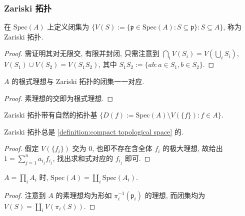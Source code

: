 \subsubsection{Zariski 拓扑}

\begin{definition}
    \label {definition:Zariski topology}
    在 \(\mathrm{Spec} (A)\) 上定义闭集为 \(\{V(S) := \{\mathfrak{p} \in \mathrm{Spec} (A) : S \subseteq \mathfrak{p}\} : S \subseteq A\}\),
    称为 Zariski 拓扑.

    \begin{proof}
        需证明其对无限交, 有限并封闭, 只需注意到 \(\bigcap_i V(S_i) = V(\bigcup_i S_i)\), \(V(S_1) \cup V(S_2) = V(S_1 S_2)\),
        其中 \(S_1 S_2 := \{ab : a \in S_1, b \in S_2\}\).
    \end{proof}
\end{definition}

\begin{lemma}
    \(A\) 的根式理想与 Zariski 拓扑的闭集一一对应.

    \begin{proof}
        素理想的交即为根式理想.
    \end{proof}
\end{lemma}

\begin{corollary}
    Zariski 拓扑带有自然的拓扑基 \(\{D(f) := \mathrm{Spec} (A) \setminus V(\{f\}) : f \in A\}\).
\end{corollary}

\begin{lemma}
    Zariski 拓扑总是 \ref{definition:compact topological space} 的.

    \begin{proof}
        假定 \(V(\{f_i\})\) 交为 \(0\), 也即不存在含全体 \(f_i\) 的极大理想, 故给出 \(1 = \sum_{j=1}^{n} a_{i_j} f_{i_j}\),
        找出求和式对应的 \(f_{i_j}\) 即可.
    \end{proof}
\end{lemma}

\begin{lemma}
    \(A = \prod_i A_i\) 时, \(\mathrm{Spec} (A) = \coprod_i \mathrm{Spec} (A_i)\).

    \begin{proof}
        注意到 \(A\) 的素理想均为形如 \(\pi_i^{-1} (\mathfrak{p}_i)\) 的理想,
        而闭集均为 \(V(S) = \coprod_i V(\pi_i (S))\).
    \end{proof}
\end{lemma}


